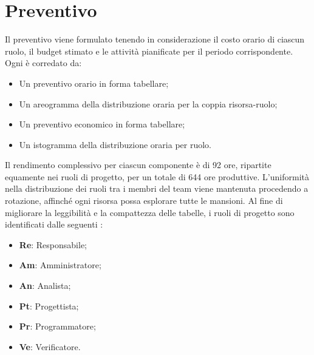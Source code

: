 \section{Preventivo}
\label{sec:preventivo}

\par Il preventivo viene formulato tenendo in considerazione il costo orario di ciascun ruolo, il budget stimato e le attività pianificate per il periodo corrispondente. Ogni  è corredato da:
\begin{itemize}
    \item Un preventivo orario in forma tabellare;
    \item Un areogramma della distribuzione oraria per la coppia risorsa-ruolo;
    \item Un preventivo economico in forma tabellare;
    \item Un istogramma della distribuzione oraria per ruolo.
\end{itemize}

\vspace{0.5\baselineskip}
\par Il rendimento complessivo per ciascun componente è di 92 ore, ripartite equamente nei ruoli di progetto, per un totale di 644 ore produttive. L'uniformità nella distribuzione dei ruoli tra i membri del team viene mantenuta procedendo a rotazione, affinché ogni risorsa possa esplorare tutte le mansioni. Al fine di migliorare la leggibilità e la compattezza delle tabelle, i ruoli di progetto sono identificati dalle seguenti :
\begin{itemize}
    \item \textbf{Re}: Responsabile;
    \item \textbf{Am}: Amministratore;
    \item \textbf{An}: Analista;
    \item \textbf{Pt}: Progettista;
    \item \textbf{Pr}: Programmatore;
    \item \textbf{Ve}: Verificatore.
\end{itemize}








